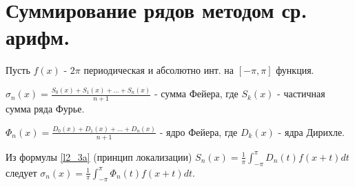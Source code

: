\documentclass{article}
\theoremstyle{definition}
\numberwithin{theorem}{section}
\numberwithin{lemma}{section}
\numberwithin{definition}{section}
\numberwithin{corollary}{section}
\numberwithin{equation}{section}
\begin{document}
\section{Суммирование рядов методом ср. арифм.}
Пусть $f(x)$ - $2\pi$ периодическая и абсолютно инт. на $[-\pi,\pi]$ функция.
\begin{definition}
  $\sigma_{n}(x)=\frac{S_0(x)+S_1(x)+\dots +S_n(x)}{n+1}$
  - сумма Фейера, где $S_k(x)$ - частичная сумма ряда Фурье.
\end{definition}
\begin{definition}
  $\Phi_n(x)=\frac{D_0(x)+D_1(x)+\dots +D_n(x)}{n+1}$ - ядро Фейера,
  где $D_k(x)$ - ядра Дирихле.
\end{definition}
Из формулы \ref{l2_3a} (принцип локализации) 
$S_n(x)=\frac{1}{\pi}\int_{-\pi}^{\pi}D_n(t)f(x+t)dt$
следует $\sigma_n(x)=\frac{1}{\pi}\int_{-\pi}^{\pi}\Phi_n(t)f(x+t)dt$.
\end{document}
